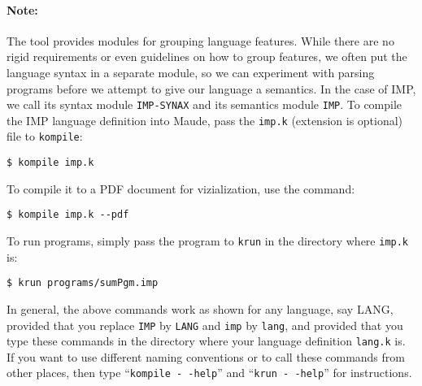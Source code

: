 \begin{latexComment}
\paragraph{Note:}{
The \K tool provides modules for grouping language features.  While
there are no rigid requirements or even guidelines on how to group
features, we often put the language syntax in a separate module, so we
can experiment with parsing programs before we attempt to give our
language a semantics.  In the case of IMP, we call its syntax module
\texttt{IMP-SYNAX} and its semantics module \texttt{IMP}.  To compile
the IMP language definition into Maude, pass the \texttt{imp.k}
(extension is optional) file to \texttt{kompile}:
\begin{verbatim}
$ kompile imp.k
\end{verbatim}
To compile it to a PDF document for vizialization, use the command:
\begin{verbatim}
$ kompile imp.k --pdf
\end{verbatim}
To run programs, simply pass the program to \texttt{krun} in the
directory where \texttt{imp.k} is:
\begin{verbatim}
$ krun programs/sumPgm.imp
\end{verbatim}
In general, the above commands work as shown for any language, say
LANG, provided that you replace \texttt{IMP} by \texttt{LANG} and
\texttt{imp} by \texttt{lang}, and provided that you type these
commands in the directory where your language definition
\texttt{lang.k} is.  If you want to use different naming
conventions or to call these commands from other places, then type
``\texttt{kompile -\,\!-help}'' and ``\texttt{krun -\,\!-help}'' for
instructions.
}

\end{latexComment}

\vspace*{3ex}
